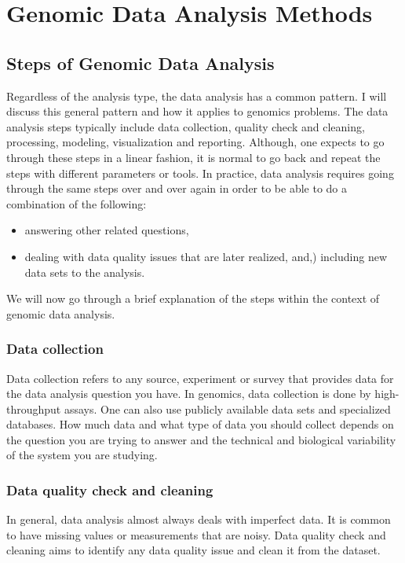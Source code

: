 \chapter{Genomic Data Analysis Methods}\label{ch:ch5}

\section{Steps of Genomic Data Analysis} 
Regardless of the analysis type, the data analysis has a common pattern. I will discuss this general pattern and how it applies to genomics problems. The data analysis steps typically include data collection, quality check and cleaning, processing, modeling, visualization and reporting. Although, one expects to go through these steps in a linear fashion, it is normal to go back and repeat the steps with different parameters or tools. In practice, data analysis requires going through the same steps over and over again in order to be able to do a combination of the following:
\begin{itemize}
	\item answering other related questions,
	\item dealing with data quality issues that are later realized, and,) including new data sets to the analysis.
\end{itemize}

We will now go through a brief explanation of the steps within the context of genomic data analysis\cite{seq2018}.

\subsection{Data collection}
Data collection refers to any source, experiment or survey that provides data for the data analysis question you have. In genomics, data collection is done by high-throughput assays. One can also use publicly available data sets and specialized databases. How much data and what type of data you should collect depends on the question you are trying to answer and the technical and biological variability of the system you are studying.

\subsection{Data quality check and cleaning} 
In general, data analysis almost always deals with imperfect data. It is common to have missing values or measurements that are noisy. Data quality check and cleaning aims to identify any data quality issue and clean it from the dataset.

